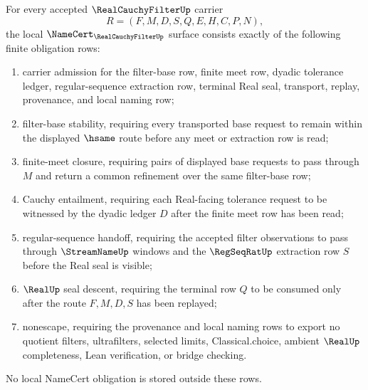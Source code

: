 \begin{theorem}
\label{thm:real-cauchy-filter-namecert-obligations}
For every accepted $\RealCauchyFilterUp$ carrier
$$
R=(F,M,D,S,Q,E,H,C,P,N),
$$
the local $\NameCert_{\RealCauchyFilterUp}$ surface consists exactly of the following finite obligation rows:
\begin{enumerate}
\item carrier admission for the filter-base row, finite meet row, dyadic tolerance ledger, regular-sequence extraction row, terminal Real seal, transport, replay, provenance, and local naming row;
\item filter-base stability, requiring every transported base request to remain within the displayed $\hsame$ route before any meet or extraction row is read;
\item finite-meet closure, requiring pairs of displayed base requests to pass through $M$ and return a common refinement over the same filter-base row;
\item Cauchy entailment, requiring each Real-facing tolerance request to be witnessed by the dyadic ledger $D$ after the finite meet row has been read;
\item regular-sequence handoff, requiring the accepted filter observations to pass through $\StreamNameUp$ windows and the $\RegSeqRatUp$ extraction row $S$ before the Real seal is visible;
\item $\RealUp$ seal descent, requiring the terminal row $Q$ to be consumed only after the route $F,M,D,S$ has been replayed;
\item nonescape, requiring the provenance and local naming rows to export no quotient filters, ultrafilters, selected limits, Classical.choice, ambient $\RealUp$ completeness, Lean verification, or bridge checking.
\end{enumerate}
No local NameCert obligation is stored outside these rows.
\end{theorem}
